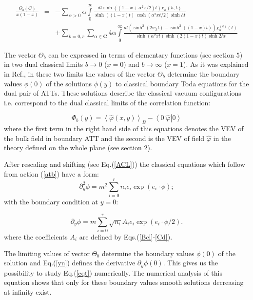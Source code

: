 \documentclass[a4paper,12pt,titlepage,final]{article}
\begin{document}
\begin{eqnarray}
\frac{\Theta _{b}(C)}{x(1-x)} &=&-\sum_{\alpha >0}\alpha
\int\limits_{0}^{\infty }\frac{dt\sinh ((1-x+\alpha ^{2}x/2)t)\chi _{\alpha
}(h,t)}{\sinh ((1-x)t)\,\cosh (\alpha ^{2}xt/2)\sinh ht}  \nonumber \\
&&+\sum_{k=0,r}\sum_{\alpha \in \mathbf{C}}4\alpha \int\limits_{0}^{\infty }
\frac{dt(\sinh ^{2}(2w_{k}t)-\sinh ^{2}((1-x)t))\chi _{\alpha }^{(k)}(t)}
{\sinh (\alpha ^{2}xt)\sinh (2(1-x)t)\sinh 2ht}  \label{tc}
\end{eqnarray}

The vector $\Theta _{b}$ can be expressed in terms of elementary 
functions (see
section 5) in two dual classical limits $b\rightarrow 0$ ($x=0$) and
$b\rightarrow \infty $ ($x=1$).
As it was explained in Ref.\cite{FO}, in these
two limits the values of the vector $\Theta _{b}$ determine the boundary 
values
$\phi (0)$ of the solutions $\phi (y)$ to classical boundary Toda equations
for the dual pair of ATTs. These solutions describe the classical vacuum
configurations i.e. correspond to the dual classical limits of the
correlation function:

\begin{equation}
\Phi _{b}(y)=\left\langle \widehat{\varphi }(x,y)\right\rangle
_{B}-\left\langle 0|\widehat{\varphi }|0\right\rangle   \label{FI}
\end{equation}
where the first term in the right hand side of this equations denotes the
VEV of the bulk field in boundary ATT and the second is the VEV of field
$\widehat{\varphi }$ in the theory defined on the whole plane (see 
section 2).

After rescaling and shifting (see Eq.(\ref{ACL})) the classical equations
which follow from action (\ref{atb}) have a form:
\begin{equation}
\partial _{y}^{2}\phi =m^{2}\sum_{i=0}^{r}n_{i}e_{i}\exp (e_{i}\cdot \phi );
\label{eqt}
\end{equation}
with the boundary condition at $y=0$:

\begin{equation}
\partial _{y}\phi =m\sum\limits_{i=0}^{r}\sqrt{n_{i}}A_{i}e_{i}\exp
(e_{i}\cdot \phi /2).  \label{yn}
\end{equation}
where the coefficients $A_{i}$ are defined by Eqs.(\ref{Bcl}-\ref{Cd}).

The limiting values of vector $\Theta _{b}$ determine the boundary
values $\phi (0)$ of the solution and Eq.(\ref{yn}) defines the
derivative $\partial_{y}\phi (0)$.  This gives us the possibility to
study Eq.(\ref{eqt}) numerically. The numerical analysis of this
equation shows that only for these boundary values smooth solutions
decreasing at infinity exist.
\end{document}
